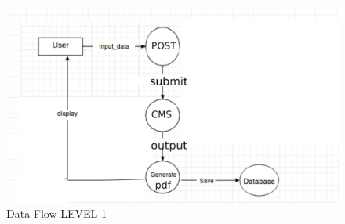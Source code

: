 \begin{figure}[h!]
\centering \includegraphics[scale=0.7]{input/images/cms2.pdf}
\caption{Data Flow LEVEL 1}
\label{fig:DFDs}
\end{figure}

